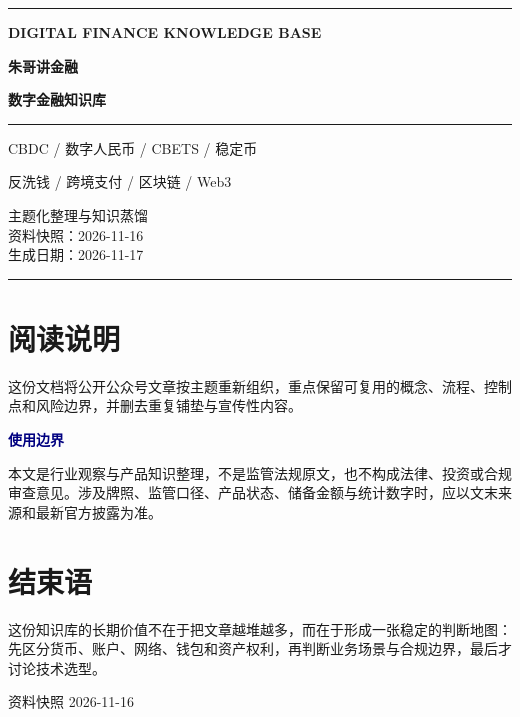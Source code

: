 \documentclass[UTF8,11pt,a4paper,openany,fontset=fandol]{ctexbook}
\begin{document}
\frontmatter
\begin{titlepage}
  \thispagestyle{empty}
  \centering
  \vspace*{1.4cm}
  {\color{orange}\rule{\textwidth}{4pt}}\par
  \vspace{1.2cm}
  {\sffamily\bfseries\color{muted}\Large DIGITAL FINANCE KNOWLEDGE BASE\par}
  \vspace{1.1cm}
  {\sffamily\bfseries\color{navy}\fontsize{34}{43}\selectfont
  朱哥讲金融\par}
  \vspace{0.12cm}
  {\sffamily\bfseries\color{navy}\fontsize{27}{36}\selectfont
  数字金融知识库\par}
  \vspace{1.1cm}
  {\color{navy}\rule{0.72\textwidth}{1.2pt}\par}
  \vspace{1.1cm}
  {\Large CBDC / 数字人民币 / CBETS / 稳定币\par}
  \vspace{0.3cm}
  {\Large 反洗钱 / 跨境支付 / 区块链 / Web3\par}
  \vfill
  \begin{minipage}{0.82\textwidth}
    \centering
    \color{muted}
    主题化整理与知识蒸馏\\
    资料快照：2026-11-16\\
    生成日期：2026-11-17
  \end{minipage}\par
  \vspace{1cm}
  {\color{orange}\rule{\textwidth}{2pt}}\par
\end{titlepage}

\chapter*{阅读说明}
这份文档将公开公众号文章按主题重新组织，重点保留可复用的概念、流程、控制点和风险边界，并删去重复铺垫与宣传性内容。

\begin{center}
\setlength{\fboxsep}{12pt}
\colorbox{pale}{\begin{minipage}{0.88\textwidth}
\textcolor{navy}{\textbf{使用边界}}\par\medskip
本文是行业观察与产品知识整理，不是监管法规原文，也不构成法律、投资或合规审查意见。涉及牌照、监管口径、产品状态、储备金额与统计数字时，应以文末来源和最新官方披露为准。
\end{minipage}}
\end{center}

\tableofcontents
\clearpage

\mainmatter


\backmatter
\chapter*{结束语}
这份知识库的长期价值不在于把文章越堆越多，而在于形成一张稳定的判断地图：先区分货币、账户、网络、钱包和资产权利，再判断业务场景与合规边界，最后才讨论技术选型。

\vfill
\begin{center}
{\sffamily\color{muted}资料快照 2026-11-16\par}
\end{center}
\end{document}
